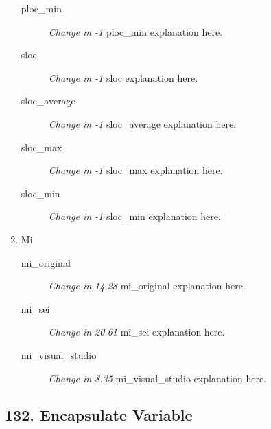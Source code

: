 \begin{enumerate}
\begin{description}
                  \item [ploc\_min] \textit{Change in -1} ploc\_min explanation here.
                  \item [sloc] \textit{Change in -1} sloc explanation here.
                  \item [sloc\_average] \textit{Change in -1} sloc\_average explanation here.
                  \item [sloc\_max] \textit{Change in -1} sloc\_max explanation here.
                  \item [sloc\_min] \textit{Change in -1} sloc\_min explanation here.
            \end{description}
      \item Mi
            \begin{description}
                  \item [mi\_original] \textit{Change in 14.28} mi\_original explanation here.
                  \item [mi\_sei] \textit{Change in 20.61} mi\_sei explanation here.
                  \item [mi\_visual\_studio] \textit{Change in 8.35} mi\_visual\_studio explanation here.
            \end{description}
\end{enumerate}
\subsection{ 132.  Encapsulate Variable }

